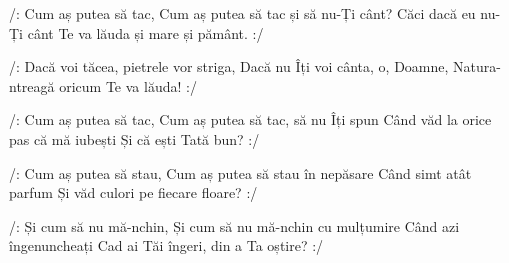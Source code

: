 

\beginverse
/: Cum aș putea să tac,
Cum aș putea să tac și să nu-Ți cânt?
Căci dacă eu nu-Ți cânt
Te va lăuda și mare și pământ. :/
\endverse

\beginchorus
/: Dacă voi tăcea, pietrele vor striga,
Dacă nu Îți voi cânta, o, Doamne,
Natura-ntreagă oricum Te va lăuda! :/
\endchorus

\beginverse
/: Cum aș putea să tac,
Cum aș putea să tac, să nu Îți spun
Când văd la orice pas că mă iubești
Și că ești Tată bun? :/
\endverse

\beginverse
/: Cum aș putea să stau,
Cum aș putea să stau în nepăsare
Când simt atât parfum
Și văd culori pe fiecare floare? :/
\endverse

\beginverse
/: Și cum să nu mă-nchin,
Și cum să nu mă-nchin cu mulțumire
Când azi îngenuncheați
Cad ai Tăi îngeri, din a Ta oștire? :/
\endverse

\endsong